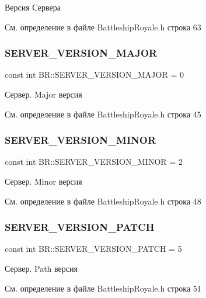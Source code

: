 Версия Сервера 



См. определение в файле Battleship\+Royale.\+h строка 63

\mbox{\label{namespace_b_r_a767d5d7fec5adfa1bf5a7c03f98beaaf}} 
\subsubsection{\texorpdfstring{SERVER\_VERSION\_MAJOR}{SERVER\_VERSION\_MAJOR}}
{\footnotesize\ttfamily const int B\+R\+::\+S\+E\+R\+V\+E\+R\+\_\+\+V\+E\+R\+S\+I\+O\+N\+\_\+\+M\+A\+J\+OR = 0}



Сервер. Major версия 



См. определение в файле Battleship\+Royale.\+h строка 45

\mbox{\label{namespace_b_r_afb69faba1bc3b5d31b8514c0103b72a0}} 
\subsubsection{\texorpdfstring{SERVER\_VERSION\_MINOR}{SERVER\_VERSION\_MINOR}}
{\footnotesize\ttfamily const int B\+R\+::\+S\+E\+R\+V\+E\+R\+\_\+\+V\+E\+R\+S\+I\+O\+N\+\_\+\+M\+I\+N\+OR = 2}



Сервер. Minor версия 



См. определение в файле Battleship\+Royale.\+h строка 48

\mbox{\label{namespace_b_r_ad496b6d1eb6371bb740df7c7fac12aba}} 
\subsubsection{\texorpdfstring{SERVER\_VERSION\_PATCH}{SERVER\_VERSION\_PATCH}}
{\footnotesize\ttfamily const int B\+R\+::\+S\+E\+R\+V\+E\+R\+\_\+\+V\+E\+R\+S\+I\+O\+N\+\_\+\+P\+A\+T\+CH = 5}



Сервер. Path версия 



См. определение в файле Battleship\+Royale.\+h строка 51

